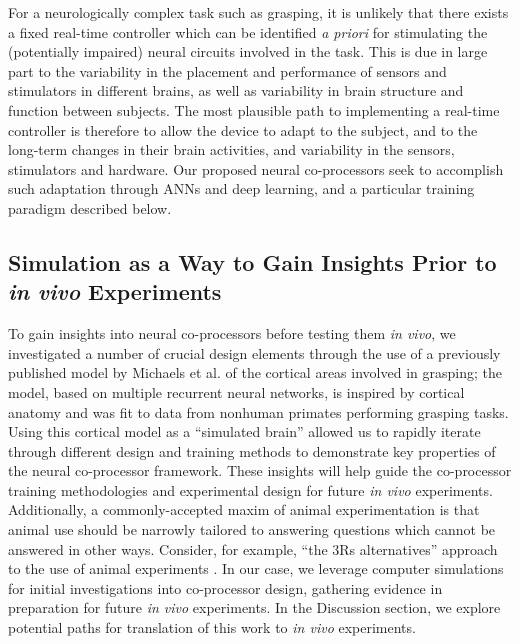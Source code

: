 \documentclass[12pt]{iopart}
\begin{document}
For a neurologically complex task such as grasping, it is unlikely that there exists
a fixed real-time controller which can be identified \textit{a priori} for stimulating the (potentially
impaired) neural circuits involved in the task. This is due in large part to the variability
in the placement and performance of sensors and stimulators in different brains, as well as variability
in brain structure and function between subjects. The most plausible path to implementing a real-time
controller is therefore to allow the device to adapt to the subject, and to the long-term changes in
their brain activities, and variability in the sensors, stimulators and hardware. Our proposed neural
co-processors seek to accomplish such adaptation through ANNs and deep learning, and a particular
training paradigm described below.

\subsection{Simulation as a Way to Gain Insights Prior to {\em in vivo} Experiments}
To gain insights into neural co-processors before testing them \textit{in vivo}, we
investigated a number of crucial design elements through the use of a previously published model by
Michaels et al. \cite{michaels.mrnn} of the cortical areas involved in grasping; the model, based on
multiple recurrent neural networks, is inspired by cortical anatomy and was fit to data from nonhuman
primates performing grasping tasks. Using this cortical model as a ``simulated brain'' allowed us to
rapidly iterate through different design and training methods to demonstrate key properties of the
neural co-processor framework. These insights will help guide the co-processor training methodologies
and experimental design for future \textit{in vivo} experiments. Additionally, a
commonly-accepted maxim of animal experimentation is that animal use should be narrowly tailored
to answering questions which cannot be answered in other ways. Consider, for example, ``the 3Rs
alternatives'' approach to the use of animal experiments \cite{nrc.care}. In our case, we leverage
computer simulations for initial investigations into co-processor design, gathering evidence in
preparation for future \textit{in vivo} experiments. In the Discussion section, we explore
potential paths for translation of this work to \textit{in vivo} experiments.
\end{document}

